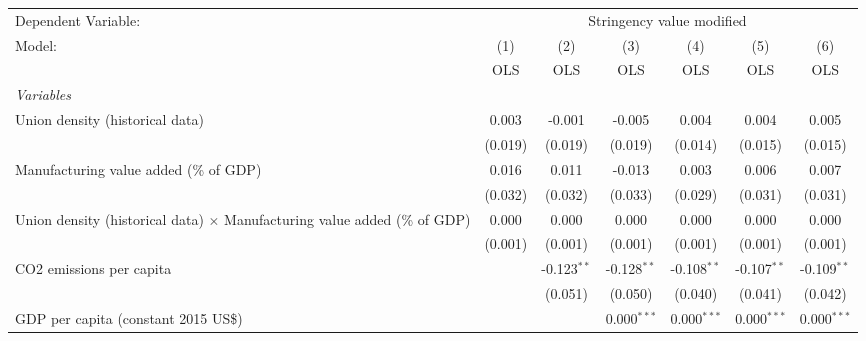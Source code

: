 
\begingroup
\centering
\begin{tabular}{lcccccc}
   \toprule
   Dependent Variable: & \multicolumn{6}{c}{Stringency value modified}\\
   Model:                                                                           & (1)     & (2)           & (3)           & (4)           & (5)           & (6)\\  
                                                                                    &  OLS    & OLS           & OLS           & OLS           & OLS           & OLS\\  
   \midrule
   \emph{Variables}\\
   Union density (historical data)                                                  & 0.003   & -0.001        & -0.005        & 0.004         & 0.004         & 0.005\\   
                                                                                    & (0.019) & (0.019)       & (0.019)       & (0.014)       & (0.015)       & (0.015)\\   
   Manufacturing value added (\% of GDP)                                            & 0.016   & 0.011         & -0.013        & 0.003         & 0.006         & 0.007\\   
                                                                                    & (0.032) & (0.032)       & (0.033)       & (0.029)       & (0.031)       & (0.031)\\   
   Union density (historical data) $\times$ Manufacturing value added (\% of GDP)   & 0.000   & 0.000         & 0.000         & 0.000         & 0.000         & 0.000\\   
                                                                                    & (0.001) & (0.001)       & (0.001)       & (0.001)       & (0.001)       & (0.001)\\   
   CO2 emissions per capita                                                         &         & -0.123$^{**}$ & -0.128$^{**}$ & -0.108$^{**}$ & -0.107$^{**}$ & -0.109$^{**}$\\   
                                                                                    &         & (0.051)       & (0.050)       & (0.040)       & (0.041)       & (0.042)\\   
   GDP per capita (constant 2015 US\$)                                              &         &               & 0.000$^{***}$ & 0.000$^{***}$ & 0.000$^{***}$ & 0.000$^{***}$\\   

\end{tabular}
